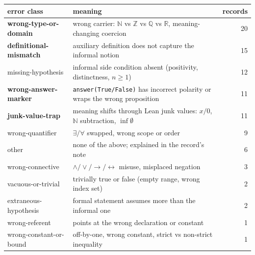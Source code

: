 \begin{tabular}{@{}lp{}r@{}}
\toprule
error class & meaning & records \\
\midrule
    \textbf{wrong-type-or-domain} & wrong carrier: $\mathbb{N}$ vs $\mathbb{Z}$ vs $\mathbb{Q}$ vs $\mathbb{R}$, meaning-changing coercion & 20 \\
    \textbf{definitional-mismatch} & auxiliary definition does not capture the informal notion & 15 \\
    missing-hypothesis & informal side condition absent (positivity, distinctness, $n \ge 1$) & 12 \\
    \textbf{wrong-answer-marker} & \texttt{answer(True/False)} has incorrect polarity or wraps the wrong proposition & 11 \\
    \textbf{junk-value-trap} & meaning shifts through Lean junk values: $x/0$, $\mathbb{N}$ subtraction, $\inf\emptyset$ & 11 \\
    wrong-quantifier & $\exists/\forall$ swapped, wrong scope or order & 9 \\
    other & none of the above; explained in the record's note & 6 \\
    wrong-connective & $\wedge/\vee/\to/\leftrightarrow$ misuse, misplaced negation & 3 \\
    vacuous-or-trivial & trivially true or false (empty range, wrong index set) & 2 \\
    extraneous-hypothesis & formal statement assumes more than the informal one & 2 \\
    wrong-referent & points at the wrong declaration or constant & 1 \\
    wrong-constant-or-bound & off-by-one, wrong constant, strict vs non-strict inequality & 1 \\
\bottomrule
\end{tabular}
